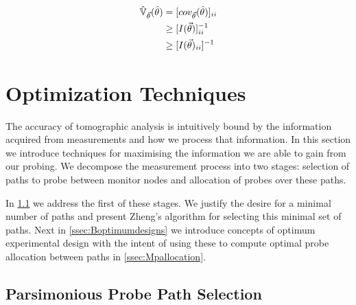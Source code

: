 \begin{align*}
    \operatorname{\hat{\mathbb{V}}}_{\vec{\theta}}(\hat\theta) &= [cov_{\vec{\theta}}(\hat\theta)]_{ii}\\
    &\geq [I(\vec{\theta})]^{-1}_{ii}\\
    &\geq [I(\vec{\theta})_{ii}]^{-1}
\end{align*}

\section{Optimization Techniques}
\label{sec:Boptimization}
The accuracy of tomographic analysis is intuitively bound by the information acquired from measurements and how we process that information. In this section we introduce techniques for maximising the information we are able to gain from our probing. We decompose the measurement process into two stages: selection of paths to probe between monitor nodes and allocation of probes over these paths.\par
In \cref{ssec:Bparsppselection} we address the first of these stages. We justify the desire for a minimal number of paths and present Zheng's algorithm for selecting this minimal set of paths. Next in \cref{ssec:Boptimumdesigns} we introduce concepts of optimum experimental design with the intent of using these to compute optimal probe allocation between paths in \cref{ssec:Mpallocation}.

\subsection{Parsimonious Probe Path Selection}
\label{ssec:Bparsppselection}


